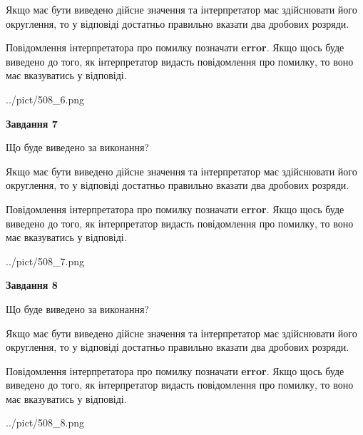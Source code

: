 \documentclass[12pt, ukrainian]{article}
\begin{document}
{\begin {Large}
Якщо має бути виведено дійсне значення та інтерпретатор має здійснювати його округлення, 
то у відповіді достатньо правильно вказати два дробових розряди.

Повідомлення інтерпретатора про помилку позначати \textbf{error}.
Якщо щось буде виведено до того, як інтерпретатор видасть повідомлення про помилку, 
то воно має вказуватись у відповіді. \par

\begin{center}
	{../pict/508_6.png}
\end{center}
\newpage

{\begin {center}\textbf{Завдання 7}\end {center}}\par
Що буде виведено за виконання? \par

Якщо має бути виведено дійсне значення та інтерпретатор має здійснювати його округлення, 
то у відповіді достатньо правильно вказати два дробових розряди.

Повідомлення інтерпретатора про помилку позначати \textbf{error}.
Якщо щось буде виведено до того, як інтерпретатор видасть повідомлення про помилку, 
то воно має вказуватись у відповіді. \par

\begin{center}
	{../pict/508_7.png}
\end{center}
\newpage

{\begin {center}\textbf{Завдання 8}\end {center}}\par
Що буде виведено за виконання? \par

Якщо має бути виведено дійсне значення та інтерпретатор має здійснювати його округлення, 
то у відповіді достатньо правильно вказати два дробових розряди.

Повідомлення інтерпретатора про помилку позначати \textbf{error}.
Якщо щось буде виведено до того, як інтерпретатор видасть повідомлення про помилку, 
то воно має вказуватись у відповіді. \par

\begin{center}
	{../pict/508_8.png}
\end{center}
\newpage


\end{Large}}
\end{document}
